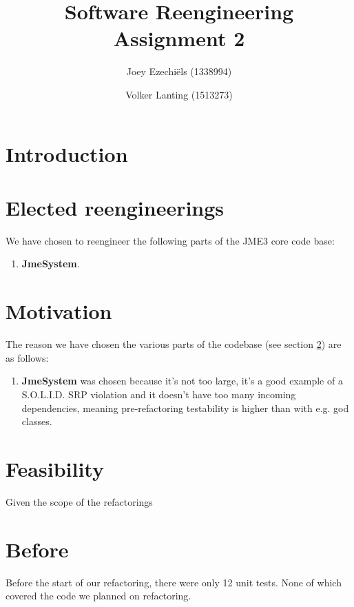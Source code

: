 \documentclass[a4paper, 10pt]{article}
\title{Software Reengineering\\
       Assignment 2}
\author{Joey Ezechi\"{e}ls (1338994) \and Volker Lanting (1513273)}
\begin{document}
\maketitle %

\newpage
\tableofcontents %


\newpage
{}
\section{Introduction}


\section{Elected reengineerings}
\label{sec:elected_reengineerings}
We have chosen to reengineer the following parts of the JME3 core code
base:
\begin{enumerate}
\item \textbf{JmeSystem}.
\end{enumerate}

\section{Motivation}
The reason we have chosen the various parts of the codebase (see
section \ref{sec:elected_reengineerings}) are as follows:
\begin{enumerate}
\item \textbf{JmeSystem} was chosen because it's not too large, it's
  a good example of a S.O.L.I.D. SRP violation and it doesn't have too
  many incoming dependencies, meaning pre-refactoring testability is
  higher than with e.g. god classes.
\end{enumerate}


\section{Feasibility}
Given the scope of the refactorings

\section{Before}
Before the start of our refactoring, there were only 12 unit tests.
None of which covered the code we planned on refactoring.
\end{document}

